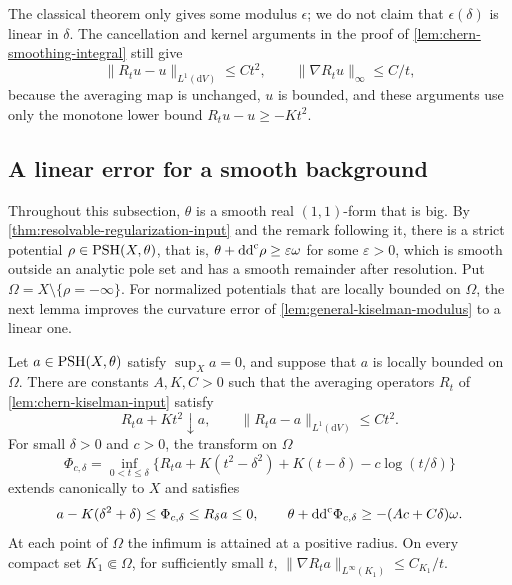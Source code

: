 The classical theorem only gives some modulus $\epsilon$; we do not claim that $\epsilon(\delta)$ is linear in $\delta$. The cancellation and kernel arguments in the proof of \cref{lem:chern-smoothing-integral} still give
\[
 \|R_tu-u\|_{L^1(\mathrm{d}V)}\leq Ct^2,
 \qquad \|\nabla R_tu\|_\infty\leq C/t,
\]
because the averaging map is unchanged, $u$ is bounded, and these arguments use only the monotone lower bound $R_tu-u\geq-Kt^2$.



\subsection{A linear error for a smooth background}

Throughout this subsection, $\theta$ is a smooth real $(1,1)$-form that is big. By \cref{thm:resolvable-regularization-input} and the remark following it, there is a strict potential $\rho\in\mathrm{PSH}(X,\theta)$, that is, $\theta+\mathrm{dd}^{\mathrm{c}}\rho\geq\varepsilon\omega$ for some $\varepsilon>0$, which is smooth outside an analytic pole set and has a smooth remainder after resolution. Put $\Omega=X\setminus\{\rho=-\infty\}$. For normalized potentials that are locally bounded on $\Omega$, the next lemma improves the curvature error of \cref{lem:general-kiselman-modulus} to a linear one.

\begin{lemma}\label{lem:smooth-background-regularization-rate}
Let $a\in\mathrm{PSH}(X,\theta)$ satisfy $\sup_Xa=0$, and suppose that $a$ is locally bounded on $\Omega$. There are constants $A,K,C>0$ such that the averaging operators $R_t$ of \cref{lem:chern-kiselman-input} satisfy
\[
 R_ta+Kt^2\downarrow a,\qquad
 \|R_ta-a\|_{L^1(\mathrm{d}V)}\leq Ct^2.
\]
For small $\delta>0$ and $c>0$, the transform on $\Omega$
\[
 \Phi_{c,\delta}
 =\inf_{0<t\leq\delta}
 \{R_ta+K(t^2-\delta^2)+K(t-\delta)-c\log(t/\delta)\}
\]
extends canonically to $X$ and satisfies
\begin{equation}\label{eq:smooth-background-transform-rate}
 a-K(\delta^2+\delta)\leq\Phi_{c,\delta}\leq R_\delta a\leq0,
 \qquad \theta+\mathrm{dd}^{\mathrm{c}}\Phi_{c,\delta}\geq-(Ac+C\delta)\omega.
\end{equation}
At each point of $\Omega$ the infimum is attained at a positive radius. On every compact set $K_1\Subset\Omega$, for sufficiently small $t$, $\|\nabla R_ta\|_{L^\infty(K_1)}\leq C_{K_1}/t$.
\end{lemma}

